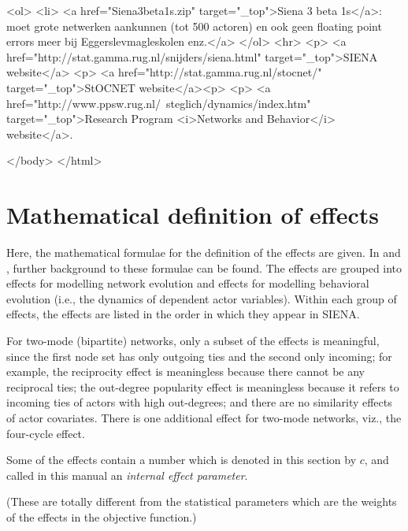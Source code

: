 \documentclass[a4paper,fleqn]{article}
\newcommand{\+}{\, + \,}
\newcommand{\si}{{\sf SIENA}}
\begin{document}
{<ol>
<li> <a href="Siena3beta1s.zip" target="_top">Siena 3 beta 1s</a>: moet grote netwerken aankunnen (tot 500 actoren)
   en ook geen floating point errors meer bij Eggerslevmagleskolen enz.</a>
</ol>
<hr>
<p>
<a href="http://stat.gamma.rug.nl/snijders/siena.html" target="_top">SIENA website</a>
<p>
<a href="http://stat.gamma.rug.nl/stocnet/" target="_top">StOCNET website</a><p>
<p>
<a href="http://www.ppsw.rug.nl/~steglich/dynamics/index.htm" target="_top">Research Program
<i>Networks and Behavior</i> website</a>.

</body>
</html>
\fi


\begin{print}
\newpage
\end{print}
\section[Formulas for effects]{Mathematical definition of effects}
\label{S_math}


Here, the mathematical formulae for the definition of the effects
are given. In \citet{Snijders01,Snijders05} and \citet*{SteglichEA10},
further background to these formulae can be found.
The effects are grouped into effects for modelling network
evolution and effects for modelling behavioral evolution (i.e.,
the dynamics of dependent actor variables). Within each group of
effects, the effects are listed in the order in which they appear
in \si.

For two-mode (bipartite) networks, only a subset of the effects is
meaningful, since the first node set has only outgoing ties
and the second only incoming; for example, the reciprocity effect
is meaningless because there cannot be any reciprocal ties;
the out-degree popularity effect is meaningless because it refers to
incoming ties of actors with high out-degrees; and there are no similarity
effects of actor covariates.
There is one additional effect for two-mode networks, viz.,
the four-cycle effect.

\hypertarget{T_effpar}{
Some of the effects contain a number which is denoted in this section
by $c$, and called in this manual an \emph{internal effect parameter}.
}
(These are totally different from the statistical parameters which are
the weights of the effects in the objective function.)

}
\end{document}
